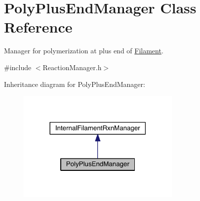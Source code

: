 \hypertarget{classPolyPlusEndManager}{\section{Poly\+Plus\+End\+Manager Class Reference}
\label{classPolyPlusEndManager}
}


Manager for polymerization at plus end of \hyperlink{classFilament}{Filament}.  




{\ttfamily \#include $<$Reaction\+Manager.\+h$>$}



Inheritance diagram for Poly\+Plus\+End\+Manager\+:\nopagebreak
\begin{figure}[H]
\begin{center}
\leavevmode
\includegraphics[width=225pt]{classPolyPlusEndManager__inherit__graph}
\end{center}
\end{figure}


